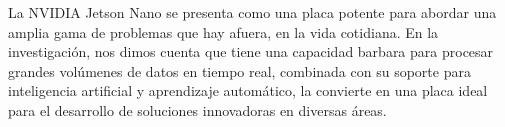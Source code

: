 La NVIDIA Jetson Nano se presenta como una placa potente para abordar una amplia gama de problemas que hay afuera, en la vida cotidiana. En la investigación, nos dimos cuenta que tiene una capacidad barbara para procesar grandes volúmenes de datos en tiempo real, combinada con su soporte para inteligencia artificial y aprendizaje automático, la convierte en una placa ideal para el desarrollo de soluciones innovadoras en diversas áreas.